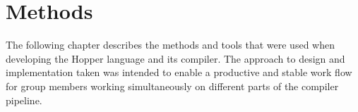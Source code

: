 \chapter{Methods}

The following chapter describes the methods and tools that were used when developing the Hopper language and its compiler. The approach to design and implementation taken was intended to enable a productive and stable work flow for group members working simultaneously on different parts of the compiler pipeline.





